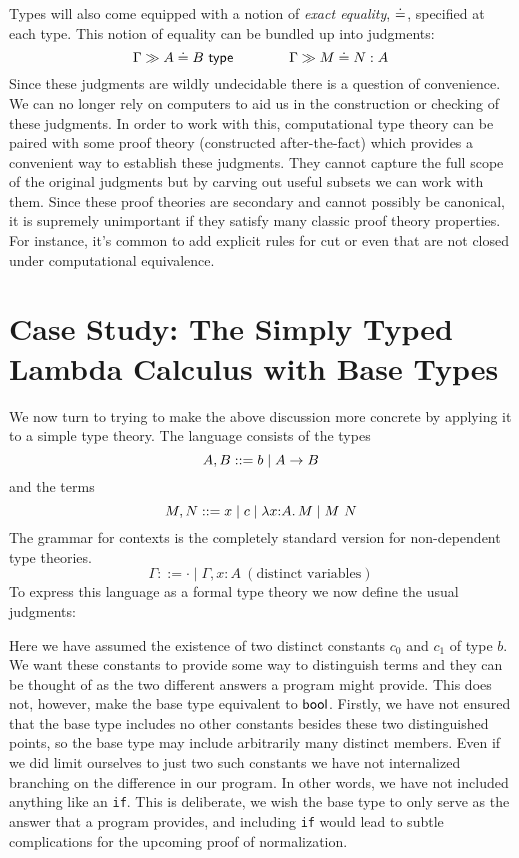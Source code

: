 \documentclass{article}
\begin{document}
Types will also come equipped with a notion of \emph{exact equality}, $\doteq$,
specified at each type. This notion of equality can be bundled up into
judgments:
\[
  \Gamma \gg A \doteq B\ \mathsf{type} \qquad \qquad
  \Gamma \gg M \doteq N : A
\]
Since these judgments are wildly undecidable there is a question of
convenience. We can no longer rely on computers to aid us in the
construction or checking of these judgments. In order to work with
this, computational type theory can be paired with some proof theory
(constructed after-the-fact) which provides a convenient way to
establish these judgments. They cannot capture the full scope of the
original judgments but by carving out useful subsets we can work with
them. Since these proof theories are secondary and cannot possibly be
canonical, it is supremely unimportant if they satisfy many classic
proof theory properties. For instance, it's common to add explicit
rules for cut or even that are not closed under computational
equivalence.

\section{Case Study: The Simply Typed Lambda Calculus with Base Types}

We now turn to trying to make the above discussion more concrete by
applying it to a simple type theory. The language consists of the types
\[
  A, B ::= b \mid A \to B
\]
and the terms
\[
  M, N ::= x \mid c \mid \lambda x {:} A.\, M \mid M\ N
\]
The grammar for contexts is the completely standard version for
non-dependent type theories.
\[
  \Gamma ::= \cdot \mid \Gamma, x : A\ (\text{distinct variables})
\]
To express this language as a formal type theory we now define the
usual judgments:
Here we have assumed the existence of two distinct constants $c_0$ and $c_1$ of type
$b$. We want these constants to provide some way to distinguish
terms and they can be thought of as the two different answers a
program might provide. This does not, however, make the base type equivalent to
$\mathsf{bool}$. Firstly, we have not ensured that the base type includes no
other constants besides these two distinguished points, so the base
type may include arbitrarily many distinct members. Even if we did
limit ourselves to just two such constants we have not internalized
branching on the difference in our program. In other words, we have
not included anything like an {\tt if}. This is deliberate, we wish the
base type to only serve as the answer that a program provides, and
including {\tt if} would lead to subtle complications for the upcoming
proof of normalization.
\end{document}
